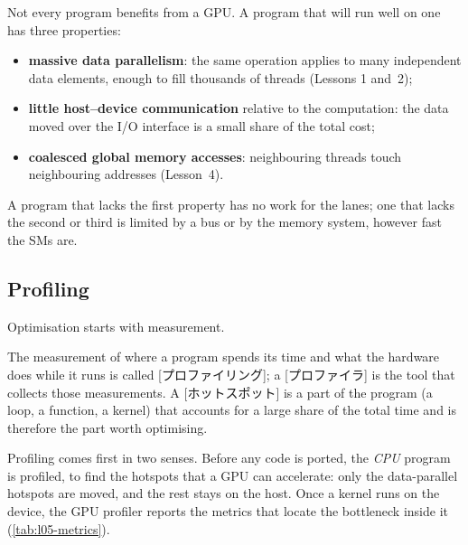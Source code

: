 \documentclass[../main.tex]{subfiles}
\begin{document}
Not every program benefits from a GPU.  A program that will run well
on one has three properties:
\begin{itemize}
  \item \textbf{massive data parallelism}: the same operation applies to
    many independent data elements, enough to fill thousands of
    threads (Lessons 1 and~2);
  \item \textbf{little host--device communication} relative to the
    computation: the data moved over the I/O interface is a small share
    of the total cost;
  \item \textbf{coalesced global memory accesses}: neighbouring threads
    touch neighbouring addresses (Lesson~4).
\end{itemize}
A program that lacks the first property has no work for the lanes; one
that lacks the second or third is limited by a bus or by the memory
system, however fast the SMs are.

\subsection{Profiling}

Optimisation starts with measurement.

\begin{definition}
  The measurement of where a program spends its time and what the
  hardware does while it runs is called [プロファイリング]; a
  [プロファイラ] is the tool that collects those
  measurements.  A [ホットスポット] is a part of the
  program (a loop, a function, a kernel) that accounts for a large share
  of the total time and is therefore the part worth optimising.
\end{definition}

Profiling comes first in two senses.  Before any code is ported, the
\emph{CPU} program is profiled, to find the hotspots that a GPU can
accelerate: only the data-parallel hotspots are moved, and the rest stays
on the host.  Once a kernel runs on the device, the GPU profiler reports
the metrics that locate the bottleneck inside it
(\cref{tab:l05-metrics}).
\end{document}
